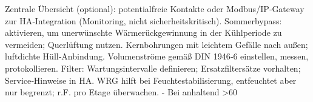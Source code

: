\markdownRendererUlItem Zentrale Übersicht (optional): potentialfreie Kontakte oder Modbus/IP‑Gateway zur HA‑Integration (Monitoring, nicht sicherheitskritisch).\markdownRendererUlItemEnd 
\markdownRendererUlItem Sommerbypass: aktivieren, um unerwünschte Wärmerückgewinnung in der Kühlperiode zu vermeiden; Querlüftung nutzen.\markdownRendererUlItemEnd 
\markdownRendererUlEndTight \markdownRendererInterblockSeparator
{}
\markdownRendererSectionEnd \markdownRendererSectionBegin
{}\markdownRendererInterblockSeparator
{}\markdownRendererUlBeginTight
\markdownRendererUlItem Kernbohrungen mit leichtem Gefälle nach außen; luftdichte Hüll‑Anbindung.\markdownRendererUlItemEnd 
\markdownRendererUlItem Volumenströme gemäß DIN 1946‑6 einstellen, messen, protokollieren.\markdownRendererUlItemEnd 
\markdownRendererUlItem Filter: Wartungsintervalle definieren; Ersatzfiltersätze vorhalten; Service‑Hinweise in HA.\markdownRendererUlItemEnd 
\markdownRendererUlEndTight \markdownRendererInterblockSeparator
{}
\markdownRendererSectionEnd \markdownRendererSectionBegin
{}\markdownRendererInterblockSeparator
{}\markdownRendererUlBegin
\markdownRendererUlItem WRG hilft bei Feuchtestabilisierung, entfeuchtet aber nur begrenzt; r.F. pro Etage überwachen.\markdownRendererUlItemEnd 
\markdownRendererUlEnd \markdownRendererInterblockSeparator
{}- Bei anhaltend >60
\markdownRendererSectionEnd 
\markdownRendererSectionEnd \markdownRendererDocumentEnd